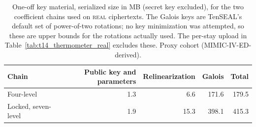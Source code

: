 \begin{table}[t]
\centering
\caption{One-off key material, serialized size in MB (secret key excluded), for the two coefficient chains used on \textsc{real} ciphertexts. The Galois keys are TenSEAL's default set of power-of-two rotations; no key minimization was attempted, so these are upper bounds for the rotations actually used. The per-stay upload in Table~\ref{tab:t14_thermometer_real} excludes these. Proxy cohort (MIMIC-IV-ED-derived).}
\label{tab:s9_keys}
\begin{tabular}{lrrrr}
\toprule
Chain & Public key and parameters & Relinearization & Galois & Total \\
\midrule
Four-level & 1.3 & 6.6 & 171.6 & 179.5 \\
Locked, seven-level & 1.9 & 15.3 & 398.1 & 415.3 \\
\bottomrule
\end{tabular}
\end{table}
